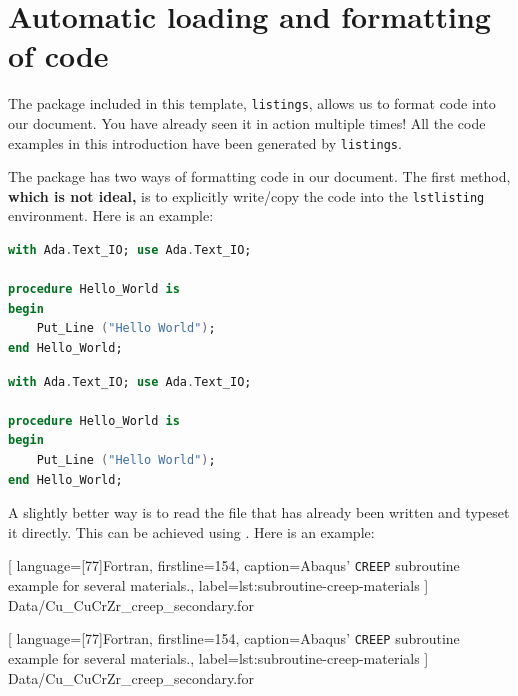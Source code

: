 \section{Automatic loading and formatting of code}

The package included in this template, \verb|listings|, allows us to format code into our document. You have already seen it in action multiple times! All the code examples in this introduction have been generated by \verb|listings|.

The package has two ways of formatting code in our document. The first method, \textbf{which is not ideal,} is to explicitly write/copy the code into the \verb|lstlisting| environment. Here is an example:

\begin{lstlisting}[language=Ada, caption={Hello world in Ada}, label={lst:hello-world-ada}]
with Ada.Text_IO; use Ada.Text_IO;

procedure Hello_World is
begin
    Put_Line ("Hello World");
end Hello_World;
\end{lstlisting}


\begin{TeXlstlisting}
\begin{lstlisting}[language=Ada, caption={Hello world in Ada}, label={lst:hello-world-ada}]
with Ada.Text_IO; use Ada.Text_IO;

procedure Hello_World is
begin
    Put_Line ("Hello World");
end Hello_World;
\end{lstlisting}
\end{TeXlstlisting}

A slightly better way is to read the file that has already been written and typeset it directly. This can be achieved using \verb||. Here is an example:


[
language={[77]Fortran},
firstline=154,
caption={Abaqus' \texttt{CREEP} subroutine example for several materials.},
label={lst:subroutine-creep-materials}
]
{Data/Cu_CuCrZr_creep_secondary.for}

\begin{TeXlstlisting}

[
language={[77]Fortran},
firstline=154,
caption={Abaqus' \texttt{CREEP} subroutine example for several materials.},
label={lst:subroutine-creep-materials}
]
{Data/Cu_CuCrZr_creep_secondary.for}
\end{TeXlstlisting}


